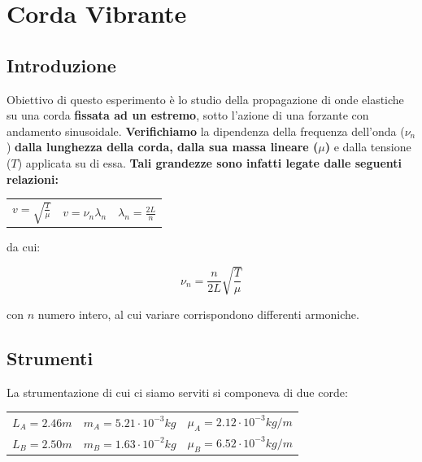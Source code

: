 \chapter{Corda Vibrante}

\section{Introduzione}

Obiettivo di questo esperimento è lo studio della propagazione di onde elastiche su una corda \textbf{fissata ad un estremo}, sotto l'azione di una forzante con andamento sinusoidale. \textbf{Verifichiamo} la dipendenza della frequenza dell'onda ($\nu_n$) \textbf{dalla lunghezza della corda, dalla sua massa lineare ($\mu$)} e dalla tensione ($T$) applicata su di essa.
\textbf{Tali grandezze sono infatti legate dalle seguenti relazioni:}
\begin{center}
\begin{tabular}{c c c}
$
v= \sqrt{\frac{T}{\mu}} 
$
&
\hspace{1cm}
$
v= \nu_{n} \lambda_n
$ 
&
\hspace{1cm}
$
\lambda_n= \frac{2L}{n} 
$
\\
\end{tabular}
\end{center}

da cui:

\begin{equation}
\nu_n=\frac{n}{2L}\sqrt{\frac{T}{\mu}}
\end{equation}

con $n$ numero intero, al cui variare corrispondono differenti armoniche.


\section{Strumenti}

La strumentazione di cui ci siamo serviti si componeva di due corde:\\

\begin{tabular}{c c c}
$L_A= 2.46 m$ & \hspace{1cm} $m_A=5.21\cdot10^{-3} kg$ & \hspace{1cm} $\mu_A= 2.12\cdot10^{-3} kg/m$\\
$L_B= 2.50 m$ & \hspace{1cm} $m_B=1.63\cdot10^{-2} kg$ & \hspace{1cm} $\mu_B= 6.52\cdot10^{-3} kg/m$\\
\end{tabular} 
\\


